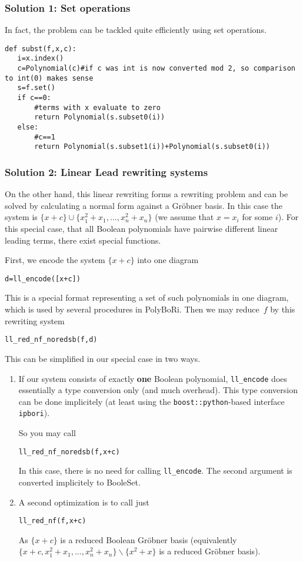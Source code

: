 \documentclass[]{article}
\newcommand{\PolyBoRi}{{\sc PolyBoRi}\xspace}
\newcommand{\explfieldequations}{{x_1^2+x_1,\ldots,x_n^2+x_n}}
\begin{document}
\subsubsection{Solution 1: Set operations}
In fact, the problem can be tackled quite efficiently using set operations.
\begin{verbatim}
def subst(f,x,c):
   i=x.index()
   c=Polynomial(c)#if c was int is now converted mod 2, so comparison to int(0) makes sense
   s=f.set()
   if c==0:
       #terms with x evaluate to zero
       return Polynomial(s.subset0(i))
   else:
       #c==1
       return Polynomial(s.subset1(i))+Polynomial(s.subset0(i))    
\end{verbatim}
\subsubsection{Solution 2: Linear Lead rewriting systems}
On the other hand, this linear rewriting forms a rewriting problem and can be solved by calculating a normal form against a Gröbner basis.
In this case the system is $\{x+c\} \cup \{\explfieldequations\}$ (we assume that $x=x_i$ for some $i$).
For this special case, that all Boolean polynomials have pairwise different linear leading terms,
there exist special functions.

First, we encode the system $\{x+c\}$ into one diagram
\begin{verbatim}
d=ll_encode([x+c])    
\end{verbatim}
%
This is a special format representing a set of such polynomials in one diagram, which is used by several procedures in
\PolyBoRi.
Then we may
reduce~$f$ by this rewriting system
\begin{verbatim}
ll_red_nf_noredsb(f,d)  
\end{verbatim}
%
%
This can be simplified in our special case in two ways.
\begin{enumerate}
    \item If our system consists of exactly \textbf{one} Boolean polynomial,
    \verb|ll_encode| does essentially  a type conversion only (and much overhead).
    This type conversion can be done implicitely (at least using the
\verb|boost::python|-based  interface \verb|ipbori|).

    So you may call
\begin{verbatim}
ll_red_nf_noredsb(f,x+c)  
\end{verbatim}
%
    In this case, there is no need for calling \verb|ll_encode|.
    The second argument is converted implicitely to BooleSet.
    \item A second optimization is to call just
\begin{verbatim}
ll_red_nf(f,x+c)
\end{verbatim}
    As $\{x+c\}$ is a reduced Boolean Gröbner basis (equivalently $\{x+c,\explfieldequations\}\backslash \{x^2+x\}$ is a reduced Gröbner basis).
\end{enumerate}
\end{document}
